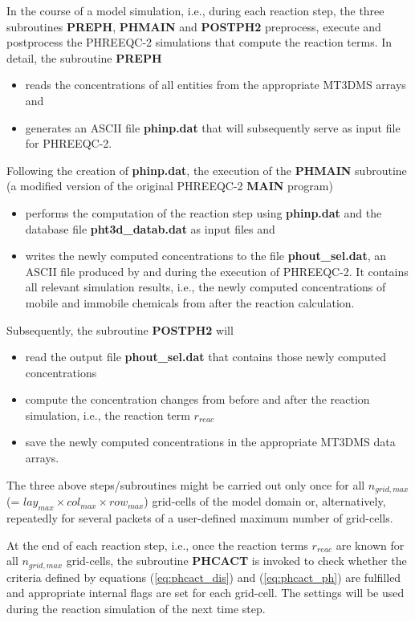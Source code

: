 In the course of a model simulation, i.e., during each reaction
step, the three subroutines \textbf{PREPH}, \textbf{PHMAIN} and
\textbf{POSTPH2} preprocess, execute and postprocess the PHREEQC-2
simulations that compute the reaction terms. In detail, the
subroutine \textbf{PREPH}
\begin{itemize}
\item reads the concentrations of all entities from the
appropriate MT3DMS arrays and \item generates an ASCII file
{\color{red} \textbf{phinp.dat}} that will subsequently serve as
input file for PHREEQC-2.
\end{itemize}
Following the creation of {\color{red} \textbf{phinp.dat}}, the
execution of the \textbf{PHMAIN} subroutine (a modified version of
the original PHREEQC-2 \textbf{MAIN} program)
\begin{itemize}
\item performs the computation of the reaction step using
{\color{red} \textbf{phinp.dat}} and the database file
{\color{red} \textbf{pht3d\_datab.dat}} as input files and \item
writes the newly computed concentrations to the file
{\color{red} \textbf{phout\_sel.dat}}, an ASCII file produced by
and during the execution of PHREEQC-2. It contains all relevant
simulation results, i.e., the newly computed concentrations of
mobile and immobile chemicals from after the reaction calculation.
\end{itemize}
Subsequently, the subroutine \textbf{POSTPH2} will
\begin{itemize}
\item read the output file {\color{red} \textbf{phout\_sel.dat}}
that contains those newly computed concentrations \item compute
the concentration changes from before and after the reaction
simulation, i.e., the reaction term $r_{reac}$ \item save the
newly computed concentrations in the appropriate MT3DMS data
arrays.
\end{itemize}
The three above steps/subroutines might be carried out only once
for all $n_{grid,max}$ (= $lay_{max} \times col_{max} \times
row_{max}$) grid-cells of the model domain or, alternatively,
repeatedly for several packets of a user-defined maximum number of
grid-cells.

At the end of each reaction step, i.e., once the reaction terms
$r_{reac}$ are known for all $n_{grid,max}$ grid-cells, the
subroutine \textbf{PHCACT} is invoked to check whether the
criteria defined by equations (\ref{eq:phcact_dis}) and
(\ref{eq:phcact_ph}) are fulfilled and appropriate internal flags
are set for each grid-cell. The settings will be used during the
reaction simulation of the next time step.

